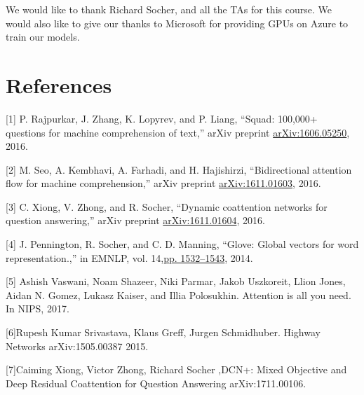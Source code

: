 \documentclass{article} %
\begin{document}
We would like to thank Richard Socher, and all the TAs for this course.
We would also like to give our thanks to Microsoft for providing GPUs on Azure to train our models.

\section*{References}

\small{

[1] P. Rajpurkar, J. Zhang, K. Lopyrev, and P. Liang, “Squad: 100,000+ questions for machine comprehension of text,” arXiv preprint \href{https://arxiv.org/abs/1606.05250}{arXiv:1606.05250}, 2016.

[2] M. Seo, A. Kembhavi, A. Farhadi, and H. Hajishirzi, “Bidirectional attention flow for machine comprehension,” arXiv preprint \href{https://arxiv.org/abs/1611.01603}{arXiv:1611.01603}, 2016.

[3] C. Xiong, V. Zhong, and R. Socher, “Dynamic coattention networks for question answering,” arXiv preprint \href{https://arxiv.org/abs/1611.01604}{arXiv:1611.01604}, 2016.

[4] J. Pennington, R. Socher, and C. D. Manning, “Glove: Global vectors for word representation.,” in EMNLP, vol. 14,\href{https://nlp.stanford.edu/pubs/glove.pdf}{pp. 1532–1543}, 2014.

[5] Ashish Vaswani, Noam Shazeer, Niki Parmar, Jakob Uszkoreit, Llion Jones, Aidan N. Gomez,
Lukasz Kaiser, and Illia Polosukhin. Attention is all you need. In NIPS, 2017.

[6]Rupesh Kumar Srivastava, Klaus Greff, Jurgen Schmidhuber. Highway Networks 	arXiv:1505.00387 2015.

[7]Caiming Xiong, Victor Zhong, Richard Socher ,DCN+: Mixed Objective and Deep Residual Coattention for Question Answering 	arXiv:1711.00106.
}
\end{document}
